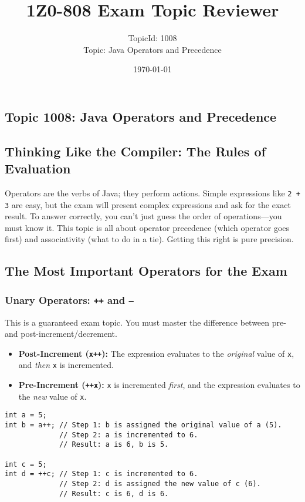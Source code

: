 \documentclass[12pt]{article}
\title{\textbf{1Z0-808 Exam Topic Reviewer}}
\author{TopicId: 1008 \\ Topic: Java Operators and Precedence}
\date{\today}
\begin{document}
\maketitle
\newpage\begin{enumerate}[label=(\arabic*)]
\section*{Topic 1008: Java Operators and Precedence}

\subsection*{Thinking Like the Compiler: The Rules of Evaluation}
Operators are the verbs of Java; they perform actions. Simple expressions like \texttt{2 + 3} are easy, but the exam will present complex expressions and ask for the exact result. To answer correctly, you can't just guess the order of operations—you must know it. This topic is all about operator precedence (which operator goes first) and associativity (what to do in a tie). Getting this right is pure precision.

\subsection*{The Most Important Operators for the Exam}

\subsubsection*{Unary Operators: \texttt{++} and \texttt{--}}
This is a guaranteed exam topic. You must master the difference between pre- and post-increment/decrement.
\begin{itemize}
    \item \textbf{Post-Increment (\texttt{x++}):} The expression evaluates to the \textit{original} value of \texttt{x}, and \textit{then} \texttt{x} is incremented.
    \item \textbf{Pre-Increment (\texttt{++x}):} \texttt{x} is incremented \textit{first}, and the expression evaluates to the \textit{new} value of \texttt{x}.
\end{itemize}
\begin{verbatim}
int a = 5;
int b = a++; // Step 1: b is assigned the original value of a (5).
             // Step 2: a is incremented to 6.
             // Result: a is 6, b is 5.

int c = 5;
int d = ++c; // Step 1: c is incremented to 6.
             // Step 2: d is assigned the new value of c (6).
             // Result: c is 6, d is 6.
\end{verbatim}


\end{enumerate}
\end{document}
